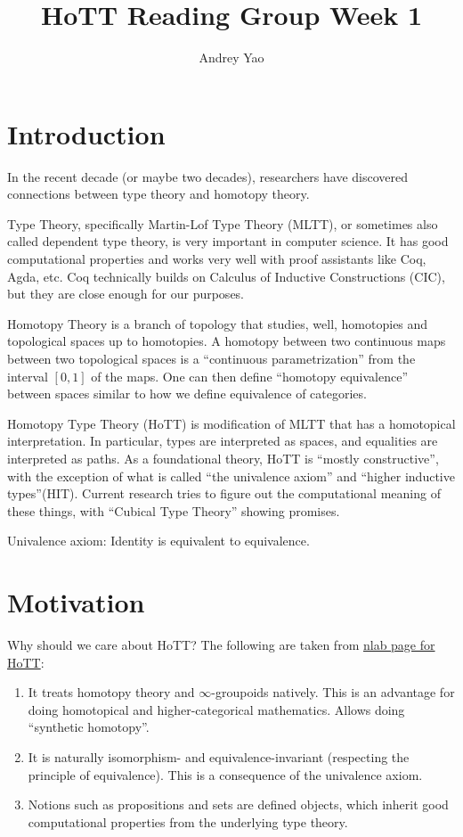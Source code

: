 \documentclass[11pt]{article}
\title{HoTT Reading Group Week 1}
\author{Andrey Yao}
\begin{document}
\maketitle


\section*{Introduction}

In the recent decade (or maybe two decades), researchers have discovered connections between type theory and homotopy theory.

Type Theory, specifically Martin-Lof Type Theory (MLTT), or sometimes also called dependent type theory, is very important in computer science. It has good computational properties and works very well with proof assistants like Coq, Agda, etc. Coq technically builds on Calculus of Inductive Constructions (CIC), but they are close enough for our purposes.

Homotopy Theory is a branch of topology that studies, well, homotopies and topological spaces up to homotopies. A homotopy between two continuous maps between two topological spaces is a ``continuous parametrization'' from the interval $[0,1]$ of the maps. One can then define ``homotopy equivalence'' between spaces similar to how we define equivalence of categories.

Homotopy Type Theory (HoTT) is modification of MLTT that has a homotopical interpretation. In particular, types are interpreted as spaces, and equalities are interpreted as paths. As a foundational theory, HoTT is ``mostly constructive'', with the exception of what is called ``the univalence axiom'' and ``higher inductive types''(HIT). Current research tries to figure out the computational meaning of these things, with ``Cubical Type Theory'' showing promises.

Univalence axiom: Identity is equivalent to equivalence.


\section*{Motivation}
Why should we care about HoTT? The following are taken from \href{https://ncatlab.org/nlab/show/homotopy+type+theory}{nlab page for HoTT}:
\begin{enumerate}
\item It treats homotopy theory and $\infty$-groupoids natively. This is an advantage for doing homotopical and higher-categorical mathematics. Allows doing ``synthetic homotopy''.
\item It is naturally isomorphism- and equivalence-invariant (respecting the principle of equivalence). This is a consequence of the univalence axiom.
\item Notions such as propositions and sets are defined objects, which inherit good computational properties from the underlying type theory.
\end{enumerate}
\end{document}
